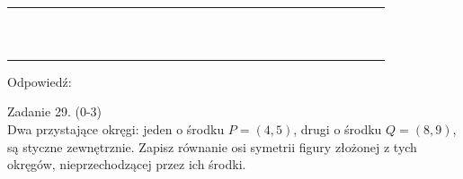 \documentclass[10pt]{article}
\begin{document}
\begin{center}
\begin{tabular}{|c|c|c|c|c|c|c|c|c|c|c|c|c|c|c|c|c|c|c|c|c|c|c|c|c|c|c|c|c|c|}
\hline
 &  &  &  &  &  &  &  &  &  &  &  &  &  &  &  &  &  &  &  &  &  &  &  &  &  &  &  &  &  \\
\hline
 &  &  &  &  &  &  &  &  &  &  &  &  &  &  &  &  &  &  &  &  &  &  &  &  &  &  &  &  &  \\
\hline
 &  &  &  &  &  &  &  &  &  &  &  &  &  &  &  &  &  &  &  &  &  &  &  &  &  &  &  &  &  \\
\hline
 &  &  &  &  &  &  &  &  &  &  &  &  &  &  &  &  &  &  &  &  &  &  &  &  &  &  &  &  &  \\
\hline
 &  &  &  &  &  &  &  &  &  &  &  &  &  &  &  &  &  &  &  &  &  &  &  &  &  &  &  &  &  \\
\hline
 &  &  &  &  &  &  &  &  &  &  &  &  &  &  &  &  &  &  &  &  &  &  &  &  &  &  &  &  &  \\
\hline
 &  &  &  &  &  &  &  &  &  &  &  &  &  &  &  &  &  &  &  &  &  &  &  &  &  &  &  &  &  \\
\hline
 &  &  &  &  &  &  &  &  &  &  &  &  &  &  &  &  &  &  &  &  &  &  &  &  &  &  &  &  &  \\
\hline
 &  &  &  &  &  &  &  &  &  &  &  &  &  &  &  &  &  &  &  &  &  &  &  &  &  &  &  &  &  \\
\hline
 &  &  &  &  &  &  &  &  &  &  &  &  &  &  &  &  &  &  &  &  &  &  &  &  &  &  &  &  &  \\
\hline
 &  &  &  &  &  &  &  &  &  &  &  &  &  &  &  &  &  &  &  &  &  &  &  &  &  &  &  &  &  \\
\hline
 &  &  &  &  &  &  &  &  &  &  &  &  &  &  &  &  &  &  &  &  &  &  &  &  &  &  &  &  &  \\
\hline
\end{tabular}
\end{center}

Odpowiedź:

Zadanie 29. (0-3)\\
Dwa przystające okręgi: jeden o środku \(P=(4,5)\), drugi o środku \(Q=(8,9)\), są styczne zewnętrznie. Zapisz równanie osi symetrii figury złożonej z tych okręgów, nieprzechodzącej przez ich środki.
\end{document}
